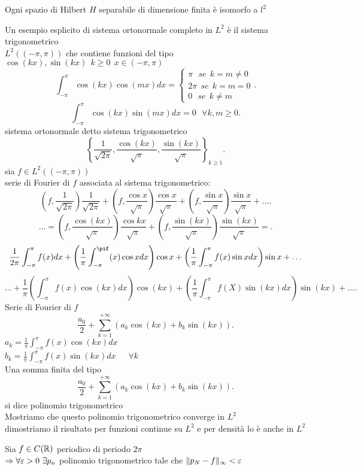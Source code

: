 \documentclass[12px]{article}
\begin{document}
\begin{coro}
	Ogni spazio di Hilbert $H$ separabile di dimensione finita è isomorfo a $l^2$
\end{coro}
Un esempio esplicito di sistema ortonormale completo in $L^2$ è il sistema trigonometrico\\
 $L^2((-\pi,\pi))$ che contiene funzioni del tipo  $\cos(kx), \sin(kx)\ \ k\geq 0\ \ x\in (-\pi,\pi)$\\
  \[
	  \int_{-\pi}^\pi\cos(kx)\cos(mx)dx = \begin{cases}
	  	\pi\ \ \ se \ \ k = m\neq 0\\
		2\pi \ \ se \ \ k = m = 0 \\
		0 \ \ \ se \ \ k\neq m
	  \end{cases}
 .\] 
 \[
	 \int^\pi_{-\pi}\cos(kx)\sin(mx)dx = 0 \ \ \ \forall k,m\geq 0
 .\] 
 sistema ortonormale detto sistema trigonometrico
 \[
	 \left\{ \frac {1}{\sqrt{2\pi}}, \frac{\cos(kx)}{\sqrt\pi}, \frac{\sin(kx)}{\sqrt\pi}\right\}_{k\geq 1}
 .\] 
 sia $f\in L^2((-\pi,\pi))$\\
 serie di Fourier di  $f$ associata al sistema trigonometrico:
 \[
	 (f,\frac{1}{\sqrt{2\pi}})\frac 1{\sqrt{2\pi}} + (f,\frac{\cos x}{\sqrt \pi})\frac{\cos x}{\sqrt\pi} + (f,\frac{\sin x}{\sqrt \pi})\frac{\sin x}{\sqrt\pi} + \ldots
 .\] 
 \[
	 \ldots = (f,\frac{\cos(k x)}{\sqrt\pi})\frac{\cos kx}{\sqrt\pi} + (f,\frac{\sin( kx)}{\sqrt\pi})\frac{\sin(kx)}{\sqrt\pi} =
 .\] 
 \[
	 \frac 1{2\pi}\int_{-\pi}^\pi f(x) dx + \left(\frac 1 \pi\int_{-\pi}^\pif(x)\cos xdx \right)\cos x + \left( \frac 1 \pi\int_{-\pi}^\pi f(x)\sin xdx \right)\sin x +\ldots
	 \]
	 \[
	  \ldots  + \frac 1 \pi \left(\int_{-\pi}^\pi f(x)\cos(kx)dx \right)\cos (kx) + \left(\frac 1 \pi\int_{-\pi}^\pi f(X)\sin(kx)dx \right)\sin(kx) + \ldots
	 .\] 
	 Serie di Fourier di $f$
	  \[
		  \frac {a_0}{2} + \sum^{+\infty}_{k = 1} \left(a_k \cos( kx) + b_k \sin(kx) \right)
	 .\]
	 $a_k = \frac 1 \pi \int_{-\pi}^\pi f(x) \cos(kx)dx$\\
	 $b_k = \frac 1 \pi \int_{-\pi}^\pi f(x)\sin(kx) dx$\ \ \ $\forall k$\\
	 Una somma finita del tipo 
	 \[
		 \frac {a_0}2  + \sum^{+\infty}_{k = 1}(a_k\cos(kx) + b_k \sin(kx))
	 .\] 
	 si dice polinomio trigonometrico\\
	 Mostriamo che questo polinomio trigonometrico converge in $L^2$\\
	 dimostriamo il risultato per funzioni continue su $L^2$ e per densità lo è anche in $L^2$\\
	 \begin{teo}
	 	Sia $f\in C(\mathbb{R})$ periodico di periodo  $2\pi$\\
		$ \Rightarrow  \forall \varepsilon > 0 \ \exists p_n$ polinomio trigonometrico tale che $\|p_N - f\|_{\infty} < \varepsilon$
	 \end{teo}
\end{document}

